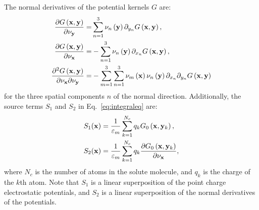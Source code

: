 \documentclass[12pt,titlepage]{article}
\begin{document}
%
The normal derivatives of the potential kernels $G$ are:
%
\begin{equation}
	\begin{split}
		\frac{\partial G\left({\bf x}, {\bf y}\right)}{\partial \nu_{\bf y}} =& \sum\limits_{n=1}^{3} \nu_n\left({\bf y}\right)\partial_{y_n}G\left({\bf x}, {\bf y}\right), \\
		\frac{\partial G\left({\bf x}, {\bf y}\right)}{\partial \nu_{\bf x}} =& -\sum\limits_{n=1}^{3} \nu_n\left({\bf y}\right)\partial_{x_n}G\left({\bf x}, {\bf y}\right), \\
		\frac{\partial^2 G\left({\bf x}, {\bf y}\right)}{\partial \nu_{\bf x}\partial \nu_{\bf y}} =& -\sum\limits_{m=1}^{3}\sum\limits_{n=1}^{3} \nu_m\left({\bf x}\right)\nu_n\left({\bf y}\right)\partial_{x_n}\partial_{y_n}G\left({\bf x}, {\bf y}\right) 
	\end{split}
\end{equation}
%
for the three spatial components $n$ of the normal direction.
Additionally, the source terms $S_1$ and $S_2$ in Eq.~\ref{eq:integraleq} are:
%
\begin{equation}
	\begin{split}
		S_1({\bf x}) &= \frac{1}{\varepsilon_m}\sum\limits_{k=1}^{N_c}q_k G_0\left({\bf x}, {\bf y}_k\right), \\
		S_2({\bf x}) &= \frac{1}{\varepsilon_m}\sum\limits_{k=1}^{N_c}q_k \frac{\partial G_0\left({\bf x}, {\bf y}_k\right)}{\partial \nu_{\bf x}},
	\end{split}
\end{equation}
%
where $N_c$ is the number of atoms in the solute molecule, and $q_k$ is the charge of the $k$th atom.
Note that $S_1$ is a linear superposition of the point charge electrostatic potentials, and $S_2$ is a linear superposition of the normal derivatives of the potentials.
\end{document}
